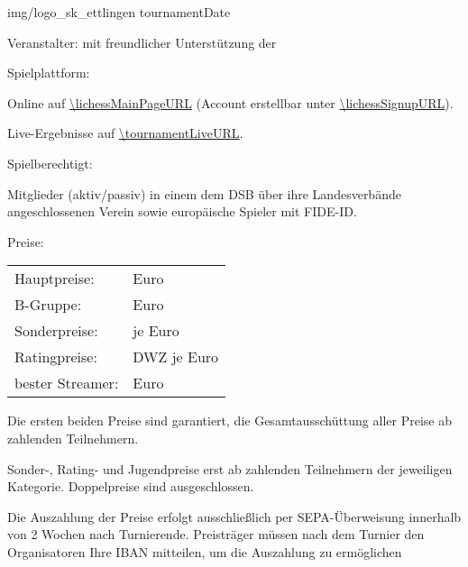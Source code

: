 \documentclass[paper=a4, fontsize=10pt]{scrartcl}
\begin{document}
                 {img/logo_sk_ettlingen}
                 {\tournamentName}
                 {tournamentDate}


\begin{basedescript}{\desclabelstyle{\multilinelabel}\desclabelwidth{10em}}
                 

\item[Veranstalter:]
  \organizerName{} mit freundlicher Unterstützung der \sponsorName{}

\item[Spielplattform:]

  Online auf \url{\lichessMainPageURL} (Account erstellbar unter
  \url{\lichessSignupURL}).

  Live-Ergebnisse auf \url{\tournamentLiveURL}.

\item[Spielberechtigt:]

  Mitglieder (aktiv/passiv) in einem dem DSB über ihre Landesverbände
  angeschlossenen Verein sowie europäische Spieler mit FIDE-ID.

\item[Preise:]

  \hspace{2em}\begin{tabular}[t]{ll}
    Hauptpreise:       &  \is{/}{\prizesTournamentA} Euro \\
    B-Gruppe:          &  \is{/}{\prizesTournamentB} Euro \\
    Sonderpreise:      &  \is{/}{\specialPrizesCateries} je \specialPrizes{} Euro \\
    Ratingpreise:      &  DWZ \is{/}{\ratingPriceCategories} je \ratingPrices{} Euro \\
    bester Streamer:   &  \specialPrizes{} Euro
  \end{tabular}

  Die ersten beiden Preise sind garantiert, die Gesamtausschüttung
  aller Preise ab \prizesGuaranteedMinParaticipants{} zahlenden
  Teilnehmern.

  Sonder-, Rating- und Jugendpreise erst ab
  \specialPrizesGuaranteedMinParaticipants{} zahlenden Teilnehmern der
  jeweiligen Kategorie. Doppelpreise sind ausgeschlossen.

  Die Auszahlung der Preise erfolgt ausschließlich per
  SEPA-Überweisung innerhalb von 2 Wochen nach
  Turnierende. Preisträger müssen nach dem Turnier den Organisatoren
  Ihre IBAN mitteilen, um die Auszahlung zu ermöglichen
  

\end{basedescript}
\end{document}
